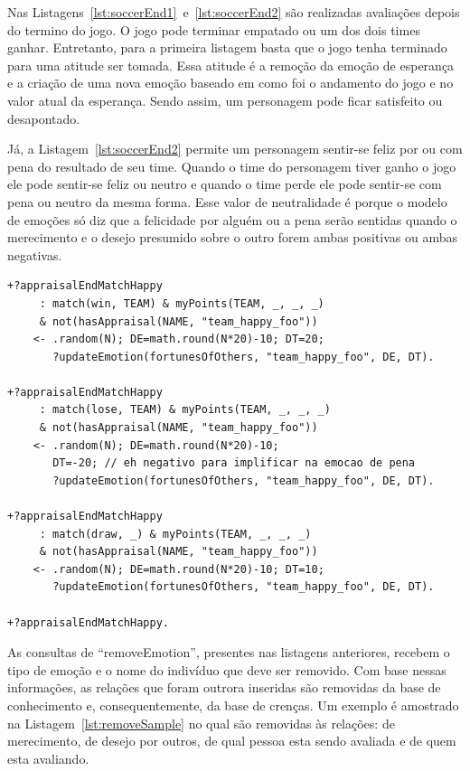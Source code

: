 Nas Listagens~\ref{lst:soccerEnd1}~e~\ref{lst:soccerEnd2} são realizadas
avaliações depois do termino do jogo. O jogo pode terminar empatado ou um dos
dois times ganhar. Entretanto, para a primeira listagem basta que o jogo tenha
terminado para uma atitude ser tomada. Essa atitude é a remoção da emoção de
esperança e a criação de uma nova emoção baseado em como foi o andamento do
jogo e no valor atual da esperança. Sendo assim, um personagem pode ficar
satisfeito ou desapontado.

Já, a Listagem~\ref{lst:soccerEnd2} permite um personagem sentir-se feliz
por ou com pena do resultado de seu time. Quando o time do personagem
tiver ganho o jogo ele pode sentir-se feliz ou neutro e quando o time perde
ele pode sentir-se com pena ou neutro da mesma forma. Esse valor de
neutralidade é porque o modelo de emoções só diz que a felicidade por alguém
ou a pena serão sentidas quando o merecimento e o desejo presumido sobre o
outro forem ambas positivas ou ambas negativas.

\begin{center}
    \begin{minipage}{140mm}
	\lstset{linewidth=140mm}
	\begin{lstlisting}[frame=trbl,
caption=Parte do código do agente referente à avaliação do final do jogo para
as emoções relacionadas com a consequência de eventos para outros,
label=lst:soccerEnd2]
+?appraisalEndMatchHappy
     : match(win, TEAM) & myPoints(TEAM, _, _, _)
     & not(hasAppraisal(NAME, "team_happy_foo"))
    <- .random(N); DE=math.round(N*20)-10; DT=20;
       ?updateEmotion(fortunesOfOthers, "team_happy_foo", DE, DT).

+?appraisalEndMatchHappy
     : match(lose, TEAM) & myPoints(TEAM, _, _, _)
     & not(hasAppraisal(NAME, "team_happy_foo"))
    <- .random(N); DE=math.round(N*20)-10;
       DT=-20; // eh negativo para implificar na emocao de pena
       ?updateEmotion(fortunesOfOthers, "team_happy_foo", DE, DT).

+?appraisalEndMatchHappy
     : match(draw, _) & myPoints(TEAM, _, _, _)
     & not(hasAppraisal(NAME, "team_happy_foo"))
    <- .random(N); DE=math.round(N*20)-10; DT=10;
       ?updateEmotion(fortunesOfOthers, "team_happy_foo", DE, DT).

+?appraisalEndMatchHappy.
	\end{lstlisting}
    \end{minipage}
\end{center}

As consultas de ``removeEmotion'', presentes nas listagens anteriores, recebem
o tipo de emoção e o nome do indivíduo que deve ser removido. Com base nessas
informações, as relações que foram outrora inseridas são removidas da base de
conhecimento e, consequentemente, da base de crenças. Um exemplo é amostrado
na Listagem~\ref{lst:removeSample} no qual são removidas às relações: de
merecimento, de desejo por outros, de qual pessoa esta sendo avaliada e de
quem esta avaliando.

